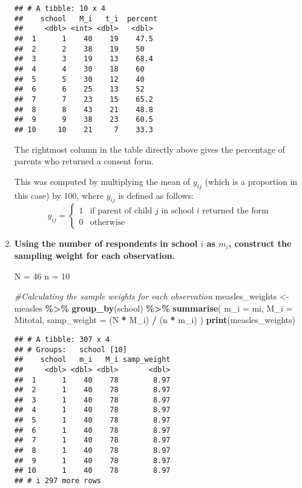 \documentclass[]{article}
\newenvironment{Shaded}{\begin{snugshade}}{\end{snugshade}}
\newcommand{\AttributeTok}[1]{\textcolor[rgb]{0.13,0.29,0.53}{#1}}
\newcommand{\CommentTok}[1]{\textcolor[rgb]{0.56,0.35,0.01}{\textit{#1}}}
\newcommand{\DecValTok}[1]{\textcolor[rgb]{0.00,0.00,0.81}{#1}}
\newcommand{\FunctionTok}[1]{\textcolor[rgb]{0.13,0.29,0.53}{\textbf{#1}}}
\newcommand{\NormalTok}[1]{#1}
\newcommand{\OtherTok}[1]{\textcolor[rgb]{0.56,0.35,0.01}{#1}}
\newcommand{\SpecialCharTok}[1]{\textcolor[rgb]{0.81,0.36,0.00}{\textbf{#1}}}
\begin{document}
\begin{enumerate}[label=(\alph*)]
\begin{verbatim}
## # A tibble: 10 x 4
##    school   M_i   t_i  percent
##     <dbl> <int> <dbl>   <dbl>
##  1      1    40    19    47.5
##  2      2    38    19    50  
##  3      3    19    13    68.4
##  4      4    30    18    60  
##  5      5    30    12    40  
##  6      6    25    13    52  
##  7      7    23    15    65.2
##  8      8    43    21    48.8
##  9      9    38    23    60.5
## 10     10    21     7    33.3
\end{verbatim}

\vspace{1em}
The rightmost column in the table directly above gives the percentage of parents who returned a consent form. 

This was computed by multiplying the mean of $y_{ij}$ (which is a proportion in this case) by 100, where $y_{ij}$ is defined as follows:
\[ y_{ij} = \begin{cases} 
      1 & \text{if parent of child } j \text{ in school } i \text{ returned the form} \\
      0 & \text{otherwise}
   \end{cases}
\]

\item \textbf{Using the number of respondents in school $i$ as $m_i$, construct the sampling weight for each observation.}

\begin{Shaded}
\begin{Highlighting}[]
\NormalTok{N }\OtherTok{=} \DecValTok{46}
\NormalTok{n }\OtherTok{=} \DecValTok{10}

\CommentTok{\#Calculating the sample weights for each observation}
\NormalTok{measles\_weights }\OtherTok{\textless{}{-}}\NormalTok{ measles }\SpecialCharTok{\%\textgreater{}\%}
  \FunctionTok{group\_by}\NormalTok{(school) }\SpecialCharTok{\%\textgreater{}\%}
  \FunctionTok{summarise}\NormalTok{(}
    \AttributeTok{m\_i =}\NormalTok{ mi,}
    \AttributeTok{M\_i =}\NormalTok{ Mitotal,}
    \AttributeTok{samp\_weight =}\NormalTok{ (N }\SpecialCharTok{*}\NormalTok{ M\_i) }\SpecialCharTok{/}\NormalTok{ (n }\SpecialCharTok{*}\NormalTok{ m\_i)}
\NormalTok{  )}
\FunctionTok{print}\NormalTok{(measles\_weights)}
\end{Highlighting}
\end{Shaded}

\begin{verbatim}
## # A tibble: 307 x 4
## # Groups:   school [10]
##    school   m_i   M_i samp_weight
##     <dbl> <dbl> <dbl>       <dbl>
##  1      1    40    78        8.97
##  2      1    40    78        8.97
##  3      1    40    78        8.97
##  4      1    40    78        8.97
##  5      1    40    78        8.97
##  6      1    40    78        8.97
##  7      1    40    78        8.97
##  8      1    40    78        8.97
##  9      1    40    78        8.97
## 10      1    40    78        8.97
## # i 297 more rows
\end{verbatim}


\end{enumerate}
\end{document}
